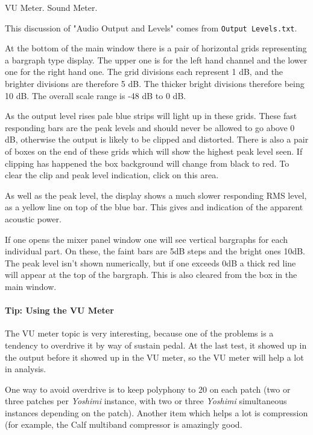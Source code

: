    VU Meter.  Sound Meter.

   This discussion of "Audio Output and Levels"
   comes from \texttt{Output Levels.txt}.

   At the bottom of the main window there is a pair of horizontal grids
   representing a bargraph type display. The upper one is for the left hand
   channel and the lower one for the right hand one. The grid divisions each
   represent 1 dB, and the brighter divisions are therefore 5 dB. The thicker
   bright divisions therefore being 10 dB. The overall scale range is -48 dB to
   0 dB.

   As the output level rises pale blue strips will light up in these grids.
   These fast responding bars are the peak levels and should never be allowed
   to go above 0 dB, otherwise the output is likely to be clipped and distorted.
   There is also a pair of boxes on the end of these grids which will show the
   highest peak level seen. If clipping has happened the box background will
   change from black to red.
   To clear the clip and peak level indication, click on this area.

   As well as the peak level, the display shows a much slower responding RMS
   level, as a yellow line on top of the blue bar. This gives and indication of
   the apparent acoustic power.

   If one opens the mixer panel window one will see vertical bargraphs for each
   individual part. On these, the faint bars are 5dB steps and the bright ones
   10dB. The peak level isn't shown numerically, but if one exceeds 0dB a thick
   red line will appear at the top of the bargraph. This is also cleared from
   the box in the main window.

\paragraph{Tip: Using the VU Meter}
\label{paragraph:tips_using_the_vu_meter}

   The VU meter topic is very interesting, because one of the problems
   is a tendency to overdrive it by way of sustain pedal.  At the last test, it
   showed up in the output before it showed up in the VU meter, so
   the VU meter will help a lot in analysis.

   One way to avoid overdrive is to keep polyphony to 20 on each patch (two
   or three patches per \textsl{Yoshimi} instance, with two or three
   \textsl{Yoshimi} simultaneous instances depending on the patch).
   Another item which helps a lot is compression (for example, the Calf
   multiband compressor is amazingly good.

